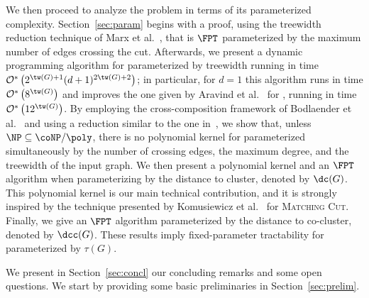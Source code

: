 We then proceed to analyze the problem in terms of its parameterized complexity.
Section~\ref{sec:param} begins with a proof, using the treewidth reduction technique of Marx et al.~\cite{marx_treewidth_reduction}, that  is $\FPT$ parameterized by the maximum number of edges crossing the cut.
Afterwards, we present a dynamic programming algorithm for  parameterized by treewidth running in time $\bigOs{2^{\tw(G)+1}(d+1)^{2\tw(G) + 2}}$; in particular, for $d=1$ this algorithm runs in time $\bigOs{8^{\tw(G)}}$ and improves the one given by Aravind et al.~\cite{matching_cut_structural} for , running in time  $\bigOs{12^{\tw(G)}}$.
By employing the cross-composition framework of Bodlaender et al.~\cite{cross_composition} and using a reduction similar to the one in~\cite{matching_cut_ipec}, we show that, unless $\NP \subseteq \coNP/\poly$, there is no polynomial kernel for  parameterized simultaneously by the number of crossing edges, the maximum degree, and the treewidth of the input graph.
We then present a polynomial kernel and an $\FPT$ algorithm when parameterizing by the distance to cluster, denoted by $\dc(G)$. This polynomial kernel is our main technical contribution, and it is strongly inspired by the technique presented by  Komusiewicz et al.~\cite{matching_cut_ipec} for \textsc{Matching Cut}. Finally, we give an $\FPT$ algorithm parameterized by the distance to co-cluster, denoted by $\dcc(G)$.
These results imply fixed-parameter tractability for  parameterized by $\tau(G)$. 

We present in Section~\ref{sec:concl} our concluding remarks and some open questions. We start by providing some basic preliminaries in Section~\ref{sec:prelim}. 
